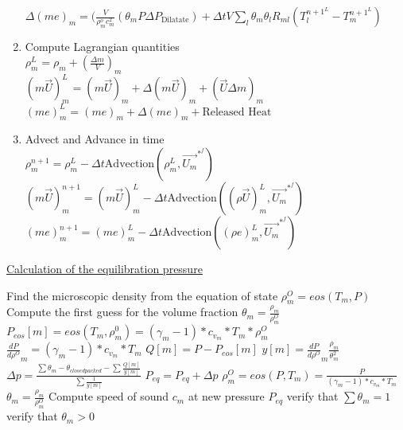 \documentclass[fleqn]{article}
\begin{document}
\begin{enumerate}
 $\Delta(me)_m =  (\frac{V}{\rho^o_m c^2_m}(\theta_m P \Delta P_{\text{Dilatate}})
    + \Delta{t}V\sum_l\theta_m\theta_l R_{ml}(T_l^{{n+1}^L} - T_m^{{n+1}^L} )$
\item Compute Lagrangian quantities\\
    $\rho^L_m = \rho_m + (\frac{\Delta{m}}{V})_m$ \\
    $(m \vec{U})^L_m = (m\vec{U})_m + \Delta(m\vec{U})_m + (\vec{U}\Delta{m})_m$ \\
    $(m e)^L_m = (m e)_m + \Delta(m e)_m + \text{Released Heat}$\\
\item Advect and Advance in time\\
$
    \rho^{n+1}_m     = \rho^L_m     - \Delta{t}\text{Advection}(\rho^L_m, \vec{U_m}^{*^{f}})$\\
$
    (m\vec{U})^{n+1}_m = (m\vec{U})^L_m - \Delta{t}\text{Advection}((\rho\vec{U})^L_m, \vec{U_m}^{*^{f}})$\\
$
    (me)^{n+1}_m       = (me)^L_m       - \Delta{t}\text{Advection}((\rho  e)^L_m, \vec{U_m}^{*^{f}})
$

\end{enumerate}

\newpage
\underline{Calculation of the equilibration pressure}

\begin{algorithmic}
\STATE Find the microscopic density from the equation of state $\rho^O_m = eos(T_m,P) $
\STATE Compute the first guess for the volume fraction $\theta_m = \frac{\rho_m}{\rho^O_m}$
    \STATE  $P_{eos}[m] = eos(T_m,\rho^0_m) = (\gamma_m -1) * c_{v_m} * T_m * \rho^O_m$
    \STATE $\frac{dP}{d\rho^O}_m = (\gamma_m -1)*c_{v_m} * T_m$
        \STATE $Q[m] = P- P_{eos}[m]$
        \STATE $y[m] = \frac{dP}{d\rho^O}_m \frac{\rho_m}{\theta_m^2}$
    \ENDFOR
    \STATE $\Delta p = \frac{  \sum{\theta_m} - \theta_{closedpacked} - \sum{\frac{Q[m]}{y[m]}}  }{\sum{\frac{1}{y[m]}} } $
    \STATE $P_{eq}=P_{eq}+ \Delta p $
    \STATE $\rho^O_m = eos(P, T_m) = \frac{P}{(\gamma_m - 1)*c_{v_m}*T_m} $ 
        \STATE $ \theta_m =  \frac{\rho_m}{\rho^O_m}$
    \ENDFOR
\ENDWHILE 
\STATE Compute speed of sound $c_m$ at new pressure $P_{eq}$
\STATE verify that $\sum \theta_m = 1$
\STATE verify that $ \theta_m > 0$
  
\end{algorithmic}
\end{document}
